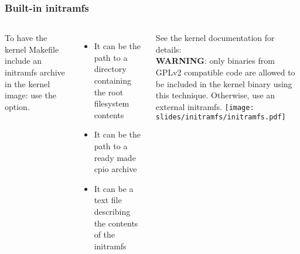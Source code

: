 \begin{frame}
  \frametitle{Built-in initramfs}
  \begin{columns}[T]
  To have the kernel Makefile include an initramfs archive in
  the kernel image: use the 
  option.
  \begin{itemize}
  \item It can be the path to a directory containing the root
    filesystem contents
  \item It can be the path to a ready made cpio archive
  \item It can be a text file describing the contents of the initramfs
  \end{itemize}
  See the kernel documentation for details:
  \vspace{0.5cm}\\
  {\bf WARNING}: only binaries from GPLv2 compatible code are allowed to be
  included in the kernel binary using this technique. Otherwise, use
  an external initramfs.
    \texttt{[image: slides/initramfs/initramfs.pdf]}
  \end{columns}
\end{frame}
